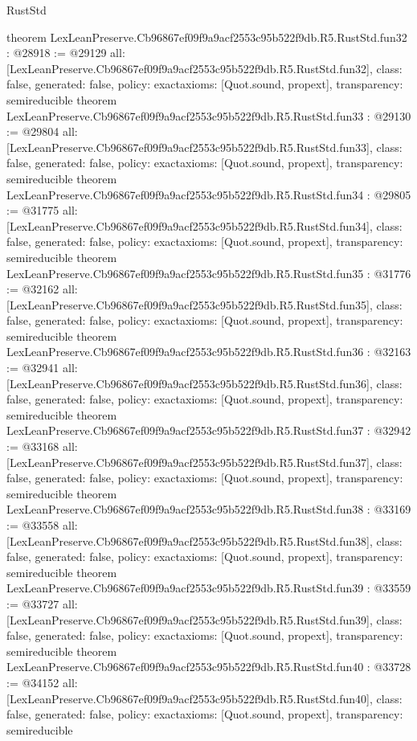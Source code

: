 \begin{lexlean}{RustStd}
\begin{coremodule}
{}
theorem LexLeanPreserve.Cb96867ef09f9a9acf2553c95b522f9db.R5.RustStd.fun32 : @28918 := @29129 {
  all: [LexLeanPreserve.Cb96867ef09f9a9acf2553c95b522f9db.R5.RustStd.fun32],
  class: false,
  generated: false,
  policy: exact{axioms: [Quot.sound, propext]},
  transparency: semireducible
}
theorem LexLeanPreserve.Cb96867ef09f9a9acf2553c95b522f9db.R5.RustStd.fun33 : @29130 := @29804 {
  all: [LexLeanPreserve.Cb96867ef09f9a9acf2553c95b522f9db.R5.RustStd.fun33],
  class: false,
  generated: false,
  policy: exact{axioms: [Quot.sound, propext]},
  transparency: semireducible
}
theorem LexLeanPreserve.Cb96867ef09f9a9acf2553c95b522f9db.R5.RustStd.fun34 : @29805 := @31775 {
  all: [LexLeanPreserve.Cb96867ef09f9a9acf2553c95b522f9db.R5.RustStd.fun34],
  class: false,
  generated: false,
  policy: exact{axioms: [Quot.sound, propext]},
  transparency: semireducible
}
theorem LexLeanPreserve.Cb96867ef09f9a9acf2553c95b522f9db.R5.RustStd.fun35 : @31776 := @32162 {
  all: [LexLeanPreserve.Cb96867ef09f9a9acf2553c95b522f9db.R5.RustStd.fun35],
  class: false,
  generated: false,
  policy: exact{axioms: [Quot.sound, propext]},
  transparency: semireducible
}
theorem LexLeanPreserve.Cb96867ef09f9a9acf2553c95b522f9db.R5.RustStd.fun36 : @32163 := @32941 {
  all: [LexLeanPreserve.Cb96867ef09f9a9acf2553c95b522f9db.R5.RustStd.fun36],
  class: false,
  generated: false,
  policy: exact{axioms: [Quot.sound, propext]},
  transparency: semireducible
}
theorem LexLeanPreserve.Cb96867ef09f9a9acf2553c95b522f9db.R5.RustStd.fun37 : @32942 := @33168 {
  all: [LexLeanPreserve.Cb96867ef09f9a9acf2553c95b522f9db.R5.RustStd.fun37],
  class: false,
  generated: false,
  policy: exact{axioms: [Quot.sound, propext]},
  transparency: semireducible
}
theorem LexLeanPreserve.Cb96867ef09f9a9acf2553c95b522f9db.R5.RustStd.fun38 : @33169 := @33558 {
  all: [LexLeanPreserve.Cb96867ef09f9a9acf2553c95b522f9db.R5.RustStd.fun38],
  class: false,
  generated: false,
  policy: exact{axioms: [Quot.sound, propext]},
  transparency: semireducible
}
theorem LexLeanPreserve.Cb96867ef09f9a9acf2553c95b522f9db.R5.RustStd.fun39 : @33559 := @33727 {
  all: [LexLeanPreserve.Cb96867ef09f9a9acf2553c95b522f9db.R5.RustStd.fun39],
  class: false,
  generated: false,
  policy: exact{axioms: [Quot.sound, propext]},
  transparency: semireducible
}
theorem LexLeanPreserve.Cb96867ef09f9a9acf2553c95b522f9db.R5.RustStd.fun40 : @33728 := @34152 {
  all: [LexLeanPreserve.Cb96867ef09f9a9acf2553c95b522f9db.R5.RustStd.fun40],
  class: false,
  generated: false,
  policy: exact{axioms: [Quot.sound, propext]},
  transparency: semireducible
}
\end{coremodule}
\end{lexlean}
